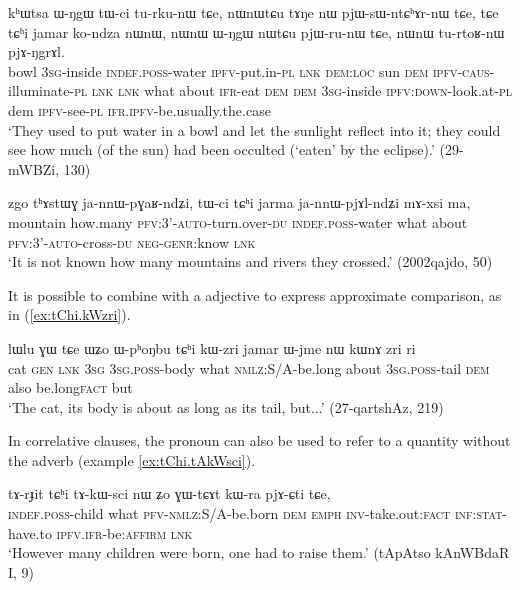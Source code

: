 \begin{exe}
\ex \label{ex:tChi.jamar.kondza}
\gll kʰɯtsa ɯ-ŋgɯ tɯ-ci tu-rku-nɯ tɕe, nɯnɯtɕu tɤŋe nɯ pjɯ-sɯ-ntɕʰɤr-nɯ tɕe, tɕe tɕʰi jamar ko-ndza nɯnɯ, nɯnɯ ɯ-ŋgɯ nɯtɕu pjɯ-ru-nɯ tɕe,  nɯnɯ tu-rtoʁ-nɯ pjɤ-ŋgrɤl.   \\
bowl \textsc{3sg}-inside \textsc{indef.poss}-water \textsc{ipfv}-put.in-\textsc{pl} \textsc{lnk} \textsc{dem:loc} sun \textsc{dem} \textsc{ipfv-caus}-illuminate-\textsc{pl} \textsc{lnk} \textsc{lnk} what about \textsc{ifr}-eat \textsc{dem} \textsc{dem} \textsc{3sg}-inside \textsc{ipfv}:\textsc{down}-look.at-\textsc{pl} dem \textsc{ipfv}-see-\textsc{pl} \textsc{ifr.ipfv}-be.usually.the.case \\
\glt `They used to put water in a bowl and let the sunlight reflect into it; they could see how much (of the sun) had been occulted (`eaten' by the eclipse).' (29-mWBZi, 130)
\end{exe}  

\begin{exe}
\ex
\gll  zgo 	tʰɤstɯɣ 	ja-nnɯ-pɣaʁ-ndʑi, 	tɯ-ci 	tɕʰi 	jarma 	ja-nnɯ-pjɤl-ndʑi 	mɤ-xsi 	ma,       \\
 mountain how.many \textsc{pfv}:3'-\textsc{auto}-turn.over-\textsc{du} \textsc{indef.poss}-water what about \textsc{pfv}:3'-\textsc{auto}-cross-\textsc{du} \textsc{neg-genr}:know \textsc{lnk} \\
\glt `It is not known how many mountains and rivers they crossed.'  (2002qajdo, 50)
\end{exe}  

It is possible to combine  with a adjective to express approximate comparison, as in (\ref{ex:tChi.kWzri}).

\begin{exe}
\ex \label{ex:tChi.kWzri}
\gll lɯlu ɣɯ tɕe ɯʑo ɯ-pʰoŋbu tɕʰi kɯ-zri jamar ɯ-jme nɯ kɯnɤ zri ri \\
cat \textsc{gen} \textsc{lnk} \textsc{3sg} \textsc{3sg.poss}-body what \textsc{nmlz}:S/A-be.long about \textsc{3sg.poss}-tail \textsc{dem} also be.long\textsc{fact} but \\
\glt `The cat, its body is about as long as its tail, but...' (27-qartshAz, 219)
\end{exe}  

In correlative clauses, the pronoun  can also be used to refer to a quantity without the adverb  (example \ref{ex:tChi.tAkWsci}).

\begin{exe}
\ex \label{ex:tChi.tAkWsci}
\gll  
tɤ-rɟit tɕʰi tɤ-kɯ-sci nɯ ʑo ɣɯ-tɕɤt kɯ-ra pjɤ-ɕti tɕe,   \\
\textsc{indef.poss}-child what \textsc{pfv-nmlz:S/A}-be.born \textsc{dem} \textsc{emph} \textsc{inv}-take.out:\textsc{fact} \textsc{inf:stat}-have.to \textsc{ipfv.ifr}-be:\textsc{affirm} \textsc{lnk} \\
\glt `However many children were born, one had to raise them.' (tApAtso kAnWBdaR I, 9)
\end{exe}  

